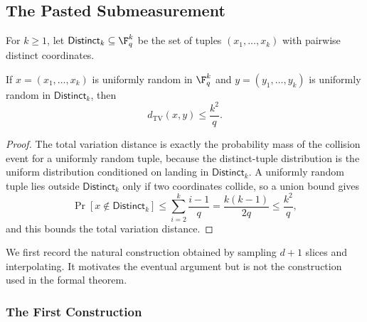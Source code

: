\subsection{The Pasted Submeasurement}

\begin{definition}\label{def:distinct-tuples}
	\leanok
	For $k \ge 1$, let $\mathsf{Distinct}_k \subseteq \F_q^k$ be the set of tuples $(x_1,\dots,x_k)$ with pairwise distinct coordinates.
\end{definition}

\begin{proposition}\label{prop:ld-dnoteq}
	\leanok
	If $x=(x_1,\dots,x_k)$ is uniformly random in $\F_q^k$ and $y=(y_1,\dots,y_k)$ is uniformly random in $\mathsf{Distinct}_k$, then
	\[
		d_{\mathrm{TV}}(x,y) \le \frac{k^2}{q}.
	\]
\end{proposition}
\begin{proof}
	\leanok
	The total variation distance is exactly the probability mass of the collision
	event for a uniformly random tuple, because the distinct-tuple distribution is
	the uniform distribution conditioned on landing in $\mathsf{Distinct}_k$.
	A uniformly random tuple lies outside $\mathsf{Distinct}_k$ only if two
	coordinates collide, so a union bound gives
	\[
		\Pr[x \notin \mathsf{Distinct}_k] \le \sum_{i=2}^k \frac{i-1}{q} = \frac{k(k-1)}{2q}\le \frac{k^2}{q},
	\]
	and this bounds the total variation distance.
\end{proof}

We first record the natural construction obtained by sampling $d+1$ slices and interpolating. It motivates the eventual argument but is not the construction used in the formal theorem.

\subsubsection{The First Construction}\label{sec:first-construction}

